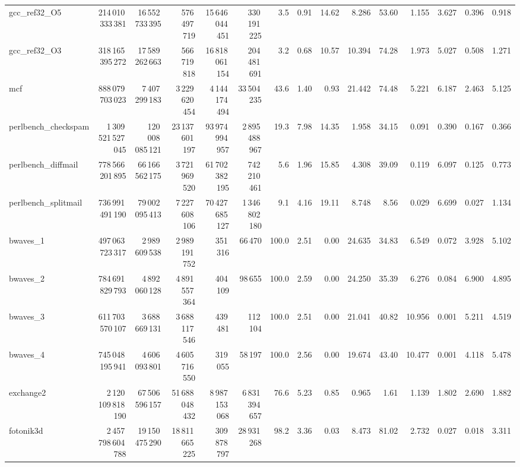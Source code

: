 \documentclass[9pt,landscape,a4paper]{article}
\begin{document}
\begin{adjustbox}{max width=\textwidth, max totalheight=0.50\textheight}
\begin{tabular}{lrrrrrrrrrrrrrr}
gcc\_ref32\_O5 & 214\,010\,333\,381 & 16\,552\,733\,395 & 576\,497\,719 & 15\,646\,044\,451 & 330\,191\,225 & 3.5 & 0.91 & 14.62 & 8.286 & 53.60 & 1.155 & 3.627 & 0.396 & 0.918 \\
gcc\_ref32\_O3 & 318\,165\,395\,272 & 17\,589\,262\,663 & 566\,719\,818 & 16\,818\,061\,154 & 204\,481\,691 & 3.2 & 0.68 & 10.57 & 10.394 & 74.28 & 1.973 & 5.027 & 0.508 & 1.271 \\
mcf & 888\,079\,703\,023 & 7\,407\,299\,183 & 3\,229\,620\,454 & 4\,144\,174\,494 & 33\,504\,235 & 43.6 & 1.40 & 0.93 & 21.442 & 74.48 & 5.221 & 6.187 & 2.463 & 5.125 \\
perlbench\_checkspam & 1\,309\,521\,527\,045 & 120\,008\,085\,121 & 23\,137\,601\,197 & 93\,974\,994\,957 & 2\,895\,488\,967 & 19.3 & 7.98 & 14.35 & 1.958 & 34.15 & 0.091 & 0.390 & 0.167 & 0.366 \\
perlbench\_diffmail & 778\,566\,201\,895 & 66\,166\,562\,175 & 3\,721\,969\,520 & 61\,702\,382\,195 & 742\,210\,461 & 5.6 & 1.96 & 15.85 & 4.308 & 39.09 & 0.119 & 6.097 & 0.125 & 0.773 \\
perlbench\_splitmail & 736\,991\,491\,190 & 79\,002\,095\,413 & 7\,227\,608\,106 & 70\,427\,685\,127 & 1\,346\,802\,180 & 9.1 & 4.16 & 19.11 & 8.748 & 8.56 & 0.029 & 6.699 & 0.027 & 1.134 \\
bwaves\_1 & 497\,063\,723\,317 & 2\,989\,609\,538 & 2\,989\,191\,752 & 351\,316 & 66\,470 & 100.0 & 2.51 & 0.00 & 24.635 & 34.83 & 6.549 & 0.072 & 3.928 & 5.102 \\
bwaves\_2 & 784\,691\,829\,793 & 4\,892\,060\,128 & 4\,891\,557\,364 & 404\,109 & 98\,655 & 100.0 & 2.59 & 0.00 & 24.250 & 35.39 & 6.276 & 0.084 & 6.900 & 4.895 \\
bwaves\_3 & 611\,703\,570\,107 & 3\,688\,669\,131 & 3\,688\,117\,546 & 439\,481 & 112\,104 & 100.0 & 2.51 & 0.00 & 21.041 & 40.82 & 10.956 & 0.001 & 5.211 & 4.519 \\
bwaves\_4 & 745\,048\,195\,941 & 4\,606\,093\,801 & 4\,605\,716\,550 & 319\,055 & 58\,197 & 100.0 & 2.56 & 0.00 & 19.674 & 43.40 & 10.477 & 0.001 & 4.118 & 5.478 \\
exchange2 & 2\,120\,109\,818\,190 & 67\,506\,596\,157 & 51\,688\,048\,432 & 8\,987\,153\,068 & 6\,831\,394\,657 & 76.6 & 5.23 & 0.85 & 0.965 & 1.61 & 1.139 & 1.802 & 2.690 & 1.882 \\
fotonik3d & 2\,457\,798\,604\,788 & 19\,150\,475\,290 & 18\,811\,665\,225 & 309\,878\,797 & 28\,931\,268 & 98.2 & 3.36 & 0.03 & 8.473 & 81.02 & 2.732 & 0.027 & 0.018 & 3.311 \\

\end{tabular}
\end{adjustbox}
\end{document}
